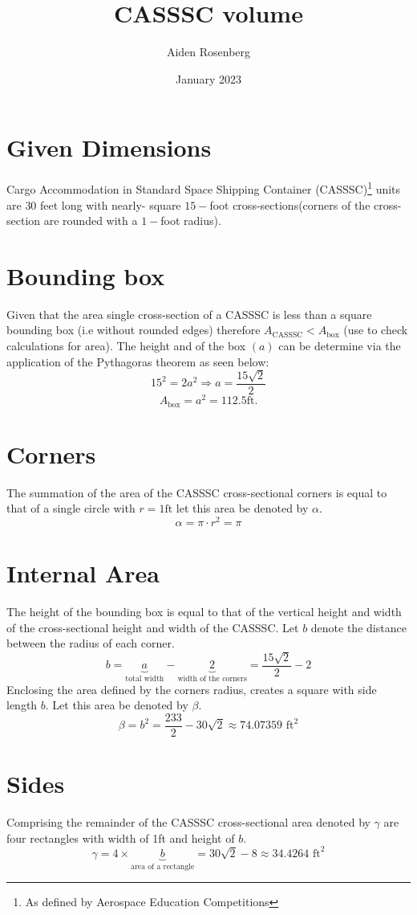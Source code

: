 \documentclass[12pt]{article}
\title{CASSSC volume}
\author{Aiden Rosenberg}
\date{January 2023}
\begin{document}
\maketitle

\section{Given Dimensions}
Cargo Accommodation in Standard Space Shipping Container (CASSSC)\footnote{As defined by Aerospace Education Competitions} units are $30$ feet  long with nearly- square $15-$foot cross-sections(corners of the cross-section are rounded with a $1-$foot radius).
\section{Bounding box}
Given that the area single cross-section of a CASSSC is less than a square bounding box (i.e without rounded edges) therefore $A_{\text{CASSSC}} < A_{\text{box}}$ (use to check calculations for area). The height and of the box $(a)$ can be determine via the application of the Pythagoras theorem as seen below:
$$ 15^2 = 2a^2 \Longrightarrow a= \frac{15\sqrt{2}}{2}$$
$$A_{\text{box}} = a^2 = 112.5 \text{ft.}$$
\section{Corners}
The summation of the area of the CASSSC cross-sectional corners is equal to that of a single circle with $r = 1\text{ft}$ let this area be denoted by $\alpha$.
$$\alpha = \pi \cdot r^2 = \pi$$
\section{Internal Area}
The height of the bounding box is equal  to that of the vertical height and width of the cross-sectional height and width of the CASSSC. Let $b$ denote the distance between the radius of each corner.  
$$b= \underbrace{a}_{\text{total width}} - \underbrace{2}_{\text{width of the corners}} = \frac{15\sqrt{2}}{2} - 2$$
Enclosing the area defined by the corners radius, creates a square with side length $b$. Let this area be denoted by $\beta$.
$$\beta = b^2 = \frac{233}{2}-30\sqrt{2} \approx 74.07359 \text{ ft}^2$$
\section{Sides}
Comprising the remainder of the CASSSC cross-sectional area denoted by $\gamma$ are four rectangles with width of 1ft and height of $b$.
$$\gamma = 4 \times \underbrace{b}_{\text{area of a rectangle}} = 30\sqrt{2}-8 \approx 34.4264 \text{ ft}^2$$
\end{document}
